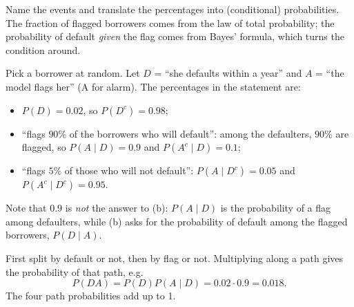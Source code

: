 \begin{solution}
	\idea Name the events and translate the percentages into (conditional)
	probabilities. The fraction of flagged borrowers comes from the law of total
	probability; the probability of default \emph{given} the flag comes from
	Bayes' formula, which turns the condition around.

	 Pick a borrower at random. Let $D$ = ``she
	defaults within a year'' and $A$ = ``the model flags her'' (A for alarm).
	The percentages in the statement are:
	\begin{itemize}[nosep]
		\item $P(D)=0.02$, so $P(D^c)=0.98$;
		\item ``flags $90\%$ of the borrowers who will default'': among the
		      defaulters, $90\%$ are flagged, so $P(A\mid D)=0.9$ and
		      $P(A^c\mid D)=0.1$;
		\item ``flags $5\%$ of those who will not default'': $P(A\mid D^c)=0.05$
		      and $P(A^c\mid D^c)=0.95$.
	\end{itemize}
	Note that $0.9$ is \emph{not} the answer to (b): $P(A\mid D)$ is the
	probability of a flag among defaulters, while (b) asks for the probability
	of default among the flagged borrowers, $P(D\mid A)$.

	\begin{minipage}{.5\linewidth}
		 First split by default or not, then by flag or not.
		Multiplying along a path gives the probability of that path, e.g.\
		\[ P(DA)=P(D)P(A\mid D)=0.02\cdot0.9=0.018. \]
		The four path probabilities add up to 1.
	\end{minipage}\hfill
	\begin{minipage}{.46\linewidth}
		\centering
	\end{minipage}


\end{solution}
